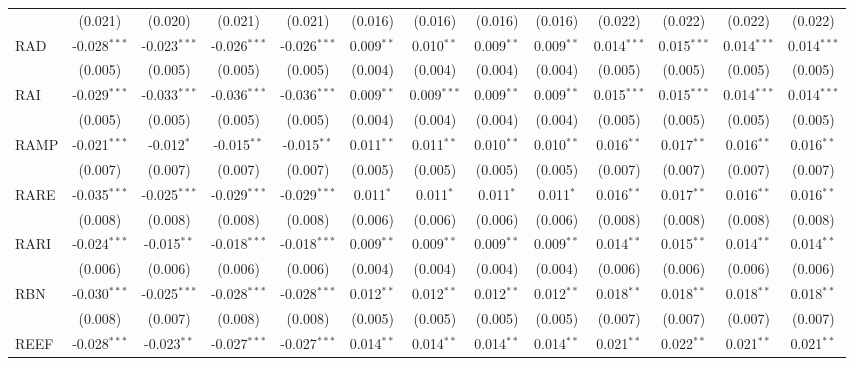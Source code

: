 \begin{table}[!htbp]
\begin{tabular}{@{\extracolsep{5pt}}lcccccccccccc}
  & (0.021) & (0.020) & (0.021) & (0.021) & (0.016) & (0.016) & (0.016) & (0.016) & (0.022) & (0.022) & (0.022) & (0.022) \\
 RAD & -0.028$^{***}$ & -0.023$^{***}$ & -0.026$^{***}$ & -0.026$^{***}$ & 0.009$^{**}$ & 0.010$^{**}$ & 0.009$^{**}$ & 0.009$^{**}$ & 0.014$^{***}$ & 0.015$^{***}$ & 0.014$^{***}$ & 0.014$^{***}$ \\
  & (0.005) & (0.005) & (0.005) & (0.005) & (0.004) & (0.004) & (0.004) & (0.004) & (0.005) & (0.005) & (0.005) & (0.005) \\
 RAI & -0.029$^{***}$ & -0.033$^{***}$ & -0.036$^{***}$ & -0.036$^{***}$ & 0.009$^{**}$ & 0.009$^{***}$ & 0.009$^{**}$ & 0.009$^{**}$ & 0.015$^{***}$ & 0.015$^{***}$ & 0.014$^{***}$ & 0.014$^{***}$ \\
  & (0.005) & (0.005) & (0.005) & (0.005) & (0.004) & (0.004) & (0.004) & (0.004) & (0.005) & (0.005) & (0.005) & (0.005) \\
 RAMP & -0.021$^{***}$ & -0.012$^{*}$ & -0.015$^{**}$ & -0.015$^{**}$ & 0.011$^{**}$ & 0.011$^{**}$ & 0.010$^{**}$ & 0.010$^{**}$ & 0.016$^{**}$ & 0.017$^{**}$ & 0.016$^{**}$ & 0.016$^{**}$ \\
  & (0.007) & (0.007) & (0.007) & (0.007) & (0.005) & (0.005) & (0.005) & (0.005) & (0.007) & (0.007) & (0.007) & (0.007) \\
 RARE & -0.035$^{***}$ & -0.025$^{***}$ & -0.029$^{***}$ & -0.029$^{***}$ & 0.011$^{*}$ & 0.011$^{*}$ & 0.011$^{*}$ & 0.011$^{*}$ & 0.016$^{**}$ & 0.017$^{**}$ & 0.016$^{**}$ & 0.016$^{**}$ \\
  & (0.008) & (0.008) & (0.008) & (0.008) & (0.006) & (0.006) & (0.006) & (0.006) & (0.008) & (0.008) & (0.008) & (0.008) \\
 RARI & -0.024$^{***}$ & -0.015$^{**}$ & -0.018$^{***}$ & -0.018$^{***}$ & 0.009$^{**}$ & 0.009$^{**}$ & 0.009$^{**}$ & 0.009$^{**}$ & 0.014$^{**}$ & 0.015$^{**}$ & 0.014$^{**}$ & 0.014$^{**}$ \\
  & (0.006) & (0.006) & (0.006) & (0.006) & (0.004) & (0.004) & (0.004) & (0.004) & (0.006) & (0.006) & (0.006) & (0.006) \\
 RBN & -0.030$^{***}$ & -0.025$^{***}$ & -0.028$^{***}$ & -0.028$^{***}$ & 0.012$^{**}$ & 0.012$^{**}$ & 0.012$^{**}$ & 0.012$^{**}$ & 0.018$^{**}$ & 0.018$^{**}$ & 0.018$^{**}$ & 0.018$^{**}$ \\
  & (0.008) & (0.007) & (0.008) & (0.008) & (0.005) & (0.005) & (0.005) & (0.005) & (0.007) & (0.007) & (0.007) & (0.007) \\
 REEF & -0.028$^{***}$ & -0.023$^{**}$ & -0.027$^{***}$ & -0.027$^{***}$ & 0.014$^{**}$ & 0.014$^{**}$ & 0.014$^{**}$ & 0.014$^{**}$ & 0.021$^{**}$ & 0.022$^{**}$ & 0.021$^{**}$ & 0.021$^{**}$ \\

\end{tabular}
\end{table}
